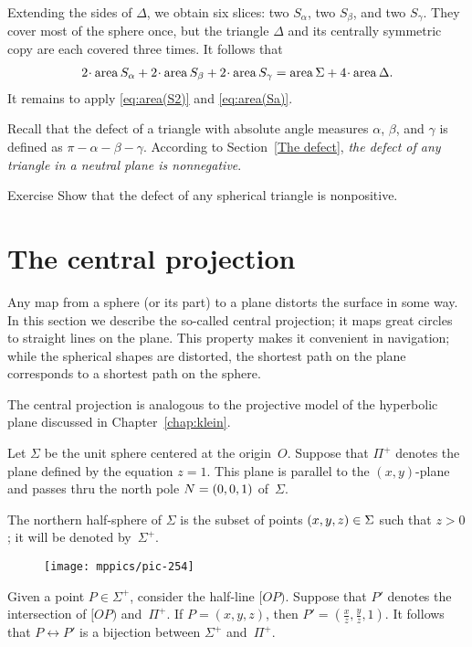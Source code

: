 Extending the sides of \( \Delta \), we obtain six slices: two \( S_\alpha \), two \( S_\beta \), and two \( S_\gamma \).
They cover most of the sphere once,
but the triangle \( \Delta \) and its centrally symmetric copy are each covered three times.
It follows that
\begin{align*}
2\cdot \area S_\alpha + 2\cdot \area S_\beta + 2\cdot \area S_\gamma = \area\Sigma + 4\cdot\area\Delta.
\end{align*}
It remains to apply \ref{eq:area(S2)} and \ref{eq:area(Sa)}.
\qeds

Recall that the defect of a triangle with absolute angle measures $\alpha$, $\beta$, and $\gamma$ is defined as $\pi - \alpha - \beta - \gamma$.
According to Section~\ref{The defect}, \textit{the defect of any triangle in a neutral plane is nonnegative}.


\begin{thm}{Exercise}\label{ex:defect-sphere}
Show that the defect of any spherical triangle is nonpositive.
\end{thm}


\section{The central projection}

Any map from a sphere (or its part) to a plane distorts the surface in some way.
In this section we describe the so-called central projection; it maps great circles to straight lines on the plane.
This property makes it convenient in navigation;
while the spherical shapes are distorted, the shortest path on the plane corresponds to a shortest path on the sphere.

The central projection is analogous to the projective model of the hyperbolic plane discussed in Chapter~\ref{chap:klein}.

\medskip

Let $\Sigma$ be the unit sphere centered at the origin~$O$.
Suppose that $\Pi^+$ denotes the plane defined by the equation $z=1$.
This plane is parallel to the $(x,y)$-plane and passes thru 
the north pole $N=(0,0,1)$ of~$\Sigma$.

The northern half-sphere of $\Sigma$
is the subset of points $(x,y,z)\in \Sigma$ such that $z>0$; it will be denoted by~$\Sigma^+$.

{

\begin{wrapfigure}{o}{40mm}
\centering
\vskip-7mm
\texttt{[image: mppics/pic-254]}
\end{wrapfigure}

Given a point $P\in \Sigma^+$, consider the half-line $[OP)$. 
Suppose that $P'$ denotes the intersection of $[OP)$ and~$\Pi^+$.
If $P=(x,y,z)$, then $P'=(\tfrac xz,\tfrac yz,1)$.
It follows that $P\leftrightarrow P'$ is a bijection between $\Sigma^+$ and~$\Pi^+$.

}

